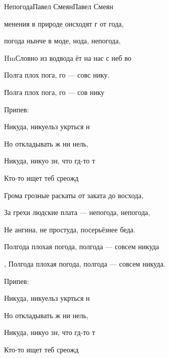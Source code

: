 \documentclass[11pt,a5paper]{book}
\newcommand{\SBChorusTagg}{Припев}
\begin{document}
\begin{song}{Непогода}{}{Павел Смеян}{Павел Смеян}{}{}

менения в природе оисходят г от года,\par
{}погода нынче в моде, нода, непогода,\par
\Ch{}Hm{Слов}но из водвода ёт на нас с неб во\par
Полга плох пога, го — совс нику.\par
Полга плох пога, го — сов нику\par

\begin{SBChorus*}
\SBChorusTagg:\par
Никуда, никуельз укрться н\par
Но откладывать ж ни нель, \par
Никуда, никуо зн, что гд-то т\par
Кто-то ищет теб среожд 
\end{SBChorus*}

Грома грозные раскаты от заката до восхода,\par
За грехи людские плата — непогода, непогода,\par
Не ангина, не простуда, посерьёзнее беда.\par
Полгода плохая погода, полгода — совсем никуда\par,
Полгода плохая погода, полгода — совсем никуда.\par

\begin{SBChorus*}
\SBChorusTagg:\par
Никуда, никуельз укрться н\par
Но откладывать ж ни нель, \par
Никуда, никуо зн, что гд-то т\par
Кто-то ищет теб среожд 
\end{SBChorus*}

\end{song}
\end{document}
